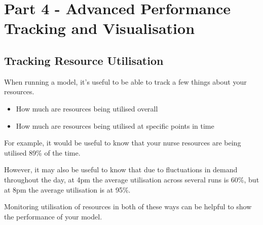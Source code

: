 \documentclass[
  letterpaper,
  DIV=11,
  numbers=noendperiod]{scrreprt}
\providecommand{\tightlist}{%
  \setlength{\itemsep}{0pt}\setlength{\parskip}{0pt}}\usepackage{longtable,booktabs,array}
\begin{document}
\part{Part 4 - Advanced Performance Tracking and Visualisation}

\chapter{Tracking Resource
Utilisation}\label{tracking-resource-utilisation}

When running a model, it's useful to be able to track a few things about
your resources.

\begin{itemize}
\tightlist
\item
  How much are resources being utilised overall
\item
  How much are resources being utilised at specific points in time
\end{itemize}

For example, it would be useful to know that your nurse resources are
being utilised 89\% of the time.

However, it may also be useful to know that due to fluctuations in
demand throughout the day, at 4pm the average utilisation across several
runs is 60\%, but at 8pm the average utilisation is at 95\%.

Monitoring utilisation of resources in both of these ways can be helpful
to show the performance of your model.
\end{document}

